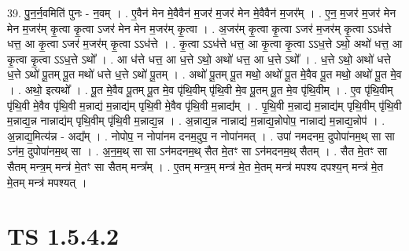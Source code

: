 \documentclass[17pt]{extarticle}
\begin{document}
39. पु॒न॒र्न॒वमिति॑ पुनः - न॒वम् । . ए॒वैन॑ मेन मे॒वैवैन॑ म॒जर॑ म॒जर॑ मेन मे॒वैवैन॑ म॒जर᳚म् । . ए॒न॒ म॒जर॑ म॒जर॑ मेन मेन म॒जर॑म् कृ॒त्वा कृ॒त्वा ऽजर॑ मेन मेन म॒जर॑म् कृ॒त्वा । . अ॒जर॑म् कृ॒त्वा कृ॒त्वा ऽजर॑ म॒जर॑म् कृ॒त्वा ऽऽध॑त्ते धत्त॒ आ कृ॒त्वा ऽजर॑ म॒जर॑म् कृ॒त्वा ऽऽध॑त्ते । . कृ॒त्वा ऽऽध॑त्ते धत्त॒ आ कृ॒त्वा कृ॒त्वा ऽऽध॒त्ते ऽथो॒ अथो॑ धत्त॒ आ कृ॒त्वा कृ॒त्वा ऽऽध॒त्ते ऽथो᳚ । . आ ध॑त्ते धत्त॒ आ ध॒त्ते ऽथो॒ अथो॑ धत्त॒ आ ध॒त्ते ऽथो᳚ । . ध॒त्ते ऽथो॒ अथो॑ धत्ते ध॒त्ते ऽथो॑ पू॒तम् पू॒त मथो॑ धत्ते ध॒त्ते ऽथो॑ पू॒तम् । . अथो॑ पू॒तम् पू॒त मथो॒ अथो॑ पू॒त मे॒वैव पू॒त मथो॒ अथो॑ पू॒त मे॒व । . अथो॒ इत्यथो᳚ । . पू॒त मे॒वैव पू॒तम् पू॒त मे॒व पृ॑थि॒वीम् पृ॑थि॒वी मे॒व पू॒तम् पू॒त मे॒व पृ॑थि॒वीम् । . ए॒व पृ॑थि॒वीम् पृ॑थि॒वी मे॒वैव पृ॑थि॒वी म॒न्नाद्य॑ म॒न्नाद्य॑म् पृथि॒वी मे॒वैव पृ॑थि॒वी म॒न्नाद्य᳚म् । . पृ॒थि॒वी म॒न्नाद्य॑ म॒न्नाद्य॑म् पृथि॒वीम् पृ॑थि॒वी म॒न्नाद्य॒न्न नान्नाद्य॑म् पृथि॒वीम् पृ॑थि॒वी म॒न्नाद्य॒न्न । . अ॒न्नाद्य॒न्न नान्नाद्य॑ म॒न्नाद्य॒न्नोपोप॒ नान्नाद्य॑ म॒न्नाद्य॒न्नोप॑ । . अ॒न्नाद्य॒मित्य॑न्न - अद्य᳚म् । . नोपोप॒ न नोपा॑नम दनम॒दुप॒ न नोपा॑नमत् । . उपा॑ नमदनम॒ दुपोपा॑नम॒थ् सा सा ऽन॑म॒ दुपोपा॑नम॒थ् सा । . अ॒न॒म॒थ् सा सा ऽन॑मदनम॒थ् सैत मे॒तꣳ सा ऽन॑मदनम॒थ् सैतम् । . सैत मे॒तꣳ सा सैतम् मन्त्र॒म् मन्त्र॑ मे॒तꣳ सा सैतम् मन्त्र᳚म् । . ए॒तम् मन्त्र॒म् मन्त्र॑ मे॒त मे॒तम् मन्त्र॑ मपश्य दपश्य॒न् मन्त्र॑ मे॒त मे॒तम् मन्त्र॑ मपश्यत् । \newline
\pagebreak
{}

\section{ TS 1.5.4.2 }
\end{document}

